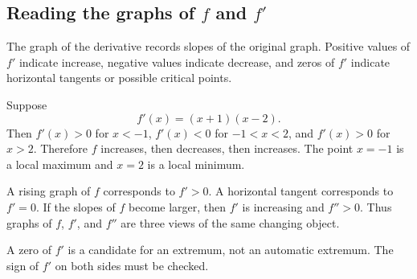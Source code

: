 \subsection{Reading the graphs of \(f\) and \(f'\)}

The graph of the derivative records slopes of the original graph. Positive values of \(f'\) indicate increase, negative values indicate decrease, and zeros of \(f'\) indicate horizontal tangents or possible critical points.

\begin{examplebox}
Suppose
\[
f'(x)=(x+1)(x-2).
\]
Then \(f'(x)>0\) for \(x<-1\), \(f'(x)<0\) for \(-1<x<2\), and \(f'(x)>0\) for \(x>2\). Therefore \(f\) increases, then decreases, then increases. The point \(x=-1\) is a local maximum and \(x=2\) is a local minimum.
\end{examplebox}

\begin{interpretationbox}
A rising graph of \(f\) corresponds to \(f'>0\). A horizontal tangent corresponds to \(f'=0\). If the slopes of \(f\) become larger, then \(f'\) is increasing and \(f''>0\). Thus graphs of \(f\), \(f'\), and \(f''\) are three views of the same changing object.
\end{interpretationbox}

\begin{remarkbox}
A zero of \(f'\) is a candidate for an extremum, not an automatic extremum. The sign of \(f'\) on both sides must be checked.
\end{remarkbox}

